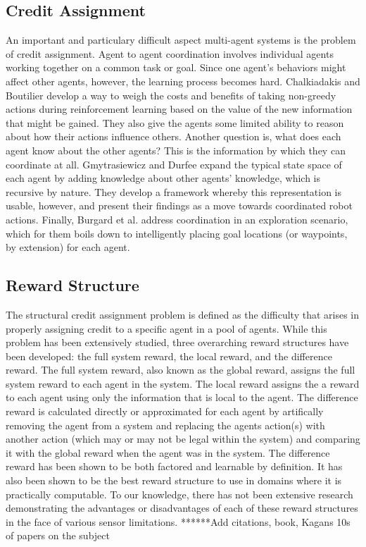 \documentclass[letterpaper, 10 pt, conference]{ieeeconf}  %
\begin{document}
\subsection{Credit Assignment}
An important and particulary difficult aspect multi-agent systems is the problem of
credit assignment. Agent to agent coordination involves individual
agents working together on a common task or goal. Since one agent’s
behaviors might affect other agents, however, the learning process
becomes hard. Chalkiadakis and Boutilier \cite{chalkiadakis2003coordination} develop a way to weigh
the costs and benefits of taking non-greedy actions during
reinforcement learning based on the value of the new information that
might be gained. They also give the agents some limited ability to
reason about how their actions influence others. Another question is,
what does each agent know about the other agents? This is the
information by which they can coordinate at all. Gmytrasiewicz and
Durfee \cite{gmytrasiewicz2000rational} expand the typical state space of each agent by adding
knowledge about other agents’ knowledge, which is recursive by
nature. They develop a framework whereby this representation is
usable, however, and present their findings as a move towards
coordinated robot actions. Finally, Burgard et al. \cite{burgard2005coordinated} address
coordination in an exploration scenario, which for them boils down to
intelligently placing goal locations (or waypoints, by extension) for
each agent.

\subsection{Reward Structure}
The structural credit assignment problem is defined as the difficulty that arises in properly assigning credit 
to a specific agent in a pool of agents.  While this problem has been extensively studied, three overarching reward 
structures have been developed: the full system reward, the local reward, and the difference reward.  The full system reward, 
also known as the global reward, assigns the full system reward to each agent in the system.  The local reward assigns the a reward
to each agent using only the information that is local to the agent. The difference reward is calculated directly or approximated for each agent by artifically removing the agent from a system and replacing the agents action(s) with another action (which may or may not be legal within the system) and comparing it with the global reward when the agent was in the system. The difference reward has been shown to be both factored and learnable by definition. It has also been shown to be the best reward structure to use in
domains where it is practically computable. To our knowledge, there has not been extensive 
research demonstrating the advantages or disadvantages of each of these reward structures in 
the face of various sensor limitations. ******Add citations, book, Kagans 10s of papers on the subject
\end{document}
